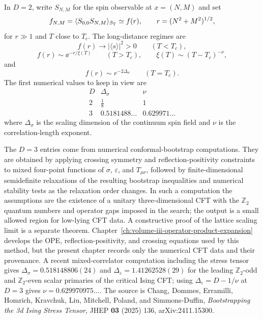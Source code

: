 In \(D=2\), write \(S_{N,M}\) for the spin observable at
\(x=(N,M)\) and set
\[
  f_{N,M}
  =
  \langle S_{0,0}S_{N,M}\rangle_{\beta_{\rm T}}
  \simeq f(r),
  \qquad
  r=(N^2+M^2)^{1/2},
\]
for \(r\gg1\) and \(T\) close to \(T_c\).  The long-distance regimes are
\[
  f(r)\longrightarrow |\langle s\rangle|^2>0
  \qquad (T<T_c),
\]
\[
  f(r)\sim \ee^{-r/\xi(T)}
  \qquad (T>T_c),
  \qquad
  \xi(T)\sim (T-T_c)^{-\nu},
\]
and
\begin{equation}
  f(r)\sim r^{-2\Delta_\sigma}
  \qquad (T=T_c).
  \label{eq:cft-opening-ising-critical-power}
\end{equation}
The first numerical values to keep in view are
\[
\begin{array}{c|cc}
  D & \Delta_\sigma & \nu \\ \hline
  2 & \frac18 & 1\\[2pt]
  3 & 0.5181488\ldots & 0.629971\ldots
\end{array}
\]
where \(\Delta_\sigma\) is the scaling dimension of the continuum spin field
and \(\nu\) is the correlation-length exponent.
\begin{remark}
The \(D=3\) entries come from numerical conformal-bootstrap computations.  They
are obtained by applying crossing symmetry and reflection-positivity constraints
to mixed four-point functions of
\(\sigma\), \(\varepsilon\), and \(T_{\mu\nu}\), followed by
finite-dimensional semidefinite relaxations of the resulting bootstrap
inequalities and numerical stability tests as the relaxation order changes.
In such a computation the assumptions are the existence of a
unitary three-dimensional CFT with the \(\mathbb Z_2\) quantum numbers and
operator gaps imposed in the search; the output is a small allowed region for
low-lying CFT data.  A constructive proof of the lattice scaling limit is a
separate theorem.
Chapter~\ref{ch:volume-iii-operator-product-expansion} develops the OPE,
reflection-positivity, and crossing equations used by this method, but the
present chapter records only the numerical CFT data and their provenance.  A
recent mixed-correlator computation including the stress tensor gives
\(\Delta_\sigma=0.518148806(24)\) and
\(\Delta_\varepsilon=1.41262528(29)\) for the leading
\(\mathbb Z_2\)-odd and \(\mathbb Z_2\)-even scalar primaries of the critical
Ising CFT; using \(\Delta_\varepsilon=D-1/\nu\) at \(D=3\) gives
\(\nu=0.629970975\ldots\).  The source is Chang, Dommes, Erramilli, Homrich,
Kravchuk, Liu, Mitchell, Poland, and Simmons-Duffin,
\emph{Bootstrapping the 3d Ising Stress Tensor}, JHEP \textbf{03} (2025) 136,
arXiv:2411.15300.
\end{remark}

